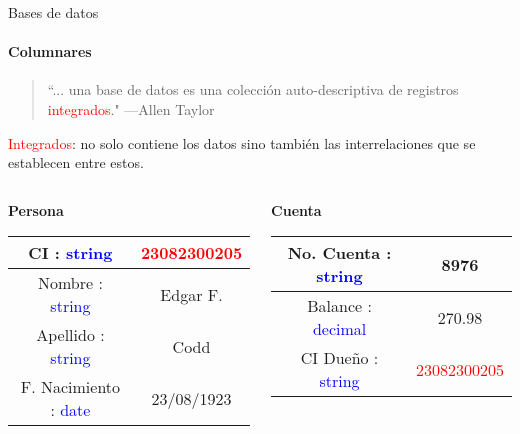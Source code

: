 \begin{frame}{Bases de datos}
    \framesubtitle{Columnares}

    \begin{overlayarea}{\linewidth}{\textheight}
        \begin{onlyenv}
            \begin{block}{}
                \begin{quote}
                    ``... una base de datos es una colecci\'on auto-descriptiva de registros \textcolor{red}{integrados}."
                    \hspace{1em plus 1fill}---Allen Taylor
                \end{quote}
                \textcolor{red}{Integrados}: no solo contiene los datos sino tambi\'en las interrelaciones
                 que se establecen entre estos.
            \end{block}
      \end{onlyenv}

      \vspace{5mm}
        \begin{columns}
            \begin{column}[t]{0.5\textwidth}
          \centering

          \large \textbf{Persona}
          \vspace{2mm}

      \begin{tabular}{|c|c|}
          \hline
          CI : \textcolor{blue}{string} & \textcolor{red}{23082300205} \\ \hline
          Nombre : \textcolor{blue}{string} & Edgar F. \\\hline
          Apellido : \textcolor{blue}{string} & Codd \\\hline
          F. Nacimiento : \textcolor{blue}{date} & 23/08/1923 \\
          \hline
      \end{tabular}
    \end{column}

            \begin{column}[t]{0.5\textwidth}
          \centering

          \large \textbf{Cuenta}
          \vspace{2mm}

                \begin{tabular}{|c|c|}
                    \hline
                    No. Cuenta : \textcolor{blue}{string} & 8976 \\\hline
                    Balance : \textcolor{blue}{decimal} & 270.98 \\\hline
                    CI Due\~no : \textcolor{blue}{string} & \textcolor{red}{23082300205} \\
                    \hline
                \end{tabular}
            \end{column}
        \end{columns}
    \end{overlayarea}
    

    
\end{frame}
